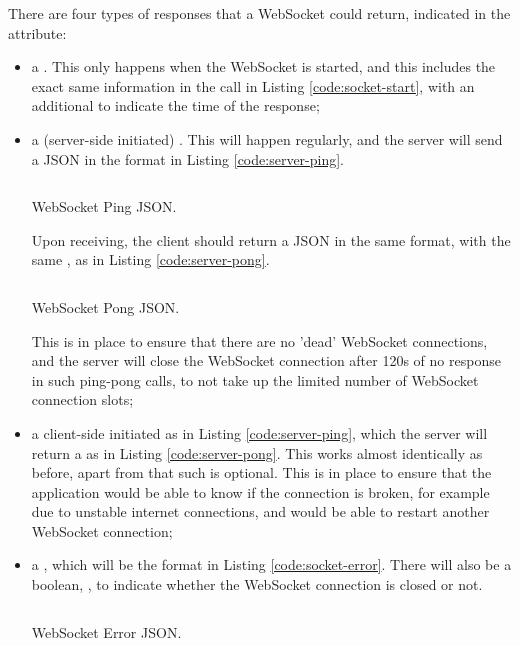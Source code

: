 There are four types of responses that a WebSocket could return, indicated in the  attribute:
\begin{itemize}
    \item a . This only happens when the WebSocket is started, and this includes the exact same information in the  call in Listing \ref{code:socket-start}, with an additional  to indicate the time of the response;
    \item a (server-side initiated) . This will happen regularly, and the server will send a JSON in the format in Listing \ref{code:server-ping}.
          \begin{listing}[htp]
              \inputminted{json}{code/ServerPing.json}
              \caption{WebSocket Ping JSON.}
              \label{code:server-ping}
          \end{listing}

          Upon receiving, the client should return a  JSON in the same format, with the same , as in Listing \ref{code:server-pong}.

          \begin{listing}[htp]
              \inputminted{json}{code/ServerPong.json}
              \caption{WebSocket Pong JSON.}
              \label{code:server-pong}
          \end{listing}

          This is in place to ensure that there are no 'dead' WebSocket connections, and the server will close the WebSocket connection after 120s of no response in such ping-pong calls, to not take up the limited number of WebSocket connection slots;
    \item a client-side initiated  as in Listing \ref{code:server-ping}, which the server will return a  as in Listing \ref{code:server-pong}. This works almost identically as before, apart from that such  is optional. This is in place to ensure that the application would be able to know if the connection is broken, for example due to unstable internet connections, and would be able to restart another WebSocket connection;
    \item a , which will be the format in Listing \ref{code:socket-error}. There will also be a boolean, , to indicate whether the WebSocket connection is closed or not.

          \begin{listing}[htp]
              \inputminted{json}{code/SocketError.json}
              \caption{WebSocket Error JSON.}
              \label{code:socket-error}
          \end{listing}


\end{itemize}
